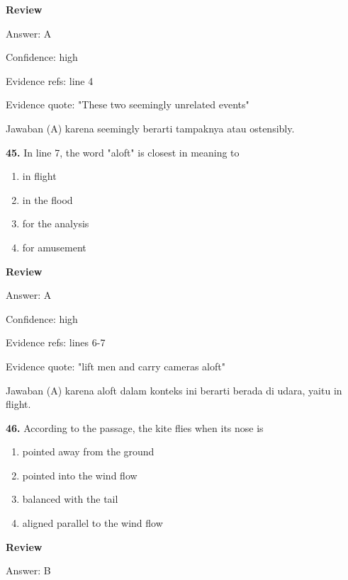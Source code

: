 \documentclass[12pt]{article}
\begin{document}
\par
\begingroup
\setlength{\parskip}{0pt}
\setlength{\parindent}{0pt}
\textbf{Review}\par
Answer: A\par
Confidence: high\par
Evidence refs: line 4\par
Evidence quote: "These two seemingly unrelated events"\par
Jawaban (A) karena seemingly berarti tampaknya atau ostensibly.\par
\endgroup
\par
\vspace{0.25\baselineskip}
\noindent\textbf{45.} In line 7, the word "aloft" is closest in meaning to
\begin{enumerate}[label=(\Alph*),leftmargin=*,itemsep=0.2em]
\item in flight
\item in the flood
\item for the analysis
\item for amusement
\end{enumerate}
\par
\begingroup
\setlength{\parskip}{0pt}
\setlength{\parindent}{0pt}
\textbf{Review}\par
Answer: A\par
Confidence: high\par
Evidence refs: lines 6-7\par
Evidence quote: "lift men and carry cameras aloft"\par
Jawaban (A) karena aloft dalam konteks ini berarti berada di udara, yaitu in flight.\par
\endgroup
\par
\vspace{0.25\baselineskip}
\noindent\textbf{46.} According to the passage, the kite flies when its nose is
\begin{enumerate}[label=(\Alph*),leftmargin=*,itemsep=0.2em]
\item pointed away from the ground
\item pointed into the wind flow
\item balanced with the tail
\item aligned parallel to the wind flow
\end{enumerate}
\par
\begingroup
\setlength{\parskip}{0pt}
\setlength{\parindent}{0pt}
\textbf{Review}\par
Answer: B\par
\end{document}
